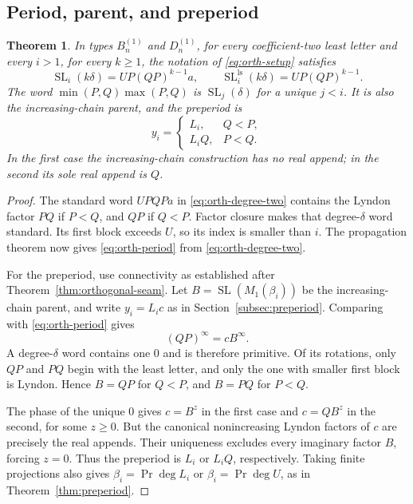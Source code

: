\documentclass[11pt]{amsart}
\numberwithin{equation}{section}
\newtheorem{theorem}{Theorem}[section]
\theoremstyle{definition}
\DeclareMathOperator{\SL}{SL}
\DeclareMathOperator{\Prj}{Pr}
\newcommand{\ls}{\mathrm{ls}}
\begin{document}
\subsection{Period, parent, and preperiod}\label{subsec:orthogonal-period}
\begin{theorem}\label{thm:orthogonal-period}
In types $B_n^{(1)}$ and $D_n^{(1)}$, for every coefficient-two least letter and every $i>1$, for every $k\geq1$, the notation of \eqref{eq:orth-setup} satisfies
\begin{equation}\label{eq:orth-period}
 \SL_i(k\delta)=UP(QP)^{k-1}a,\qquad
 \SL_i^{\ls}(k\delta)=UP(QP)^{k-1}.
\end{equation}
The word $\min(P,Q)\max(P,Q)$ is $\SL_j(\delta)$ for a unique $j<i$. It is also the increasing-chain parent, and the preperiod is
\[
 y_i=\begin{cases}L_i,&Q<P,\\L_iQ,&P<Q.\end{cases}
\]
In the first case the increasing-chain construction has no real append; in the second its sole real append is $Q$.
\end{theorem}
\begin{proof}
The standard word $UPQPa$ in \eqref{eq:orth-degree-two} contains the Lyndon factor $PQ$ if $P<Q$, and $QP$ if $Q<P$. Factor closure makes that degree-$\delta$ word standard. Its first block exceeds $U$, so its index is smaller than $i$. The propagation theorem \cite[Proposition~6.32]{ET} now gives \eqref{eq:orth-period} from \eqref{eq:orth-degree-two}.

For the preperiod, use connectivity as established after Theorem~\ref{thm:orthogonal-seam}. Let $B=\SL(M_1(\beta_i))$ be the increasing-chain parent, and write $y_i=L_ic$ as in Section~\ref{subsec:preperiod}. Comparing \cite[Lemma~6.45]{ETC} with \eqref{eq:orth-period} gives
\[
 (QP)^\infty=cB^\infty.
\]
A degree-$\delta$ word contains one $0$ and is therefore primitive. Of its rotations, only $QP$ and $PQ$ begin with the least letter, and only the one with smaller first block is Lyndon. Hence $B=QP$ for $Q<P$, and $B=PQ$ for $P<Q$.

The phase of the unique $0$ gives $c=B^z$ in the first case and $c=QB^z$ in the second, for some $z\geq0$. But the canonical nonincreasing Lyndon factors of $c$ are precisely the real appends. Their uniqueness excludes every imaginary factor $B$, forcing $z=0$. Thus the preperiod is $L_i$ or $L_iQ$, respectively. Taking finite projections also gives $\beta_i=\Prj\deg L_i$ or $\beta_i=\Prj\deg U$, as in Theorem~\ref{thm:preperiod}.
\end{proof}
\end{document}
